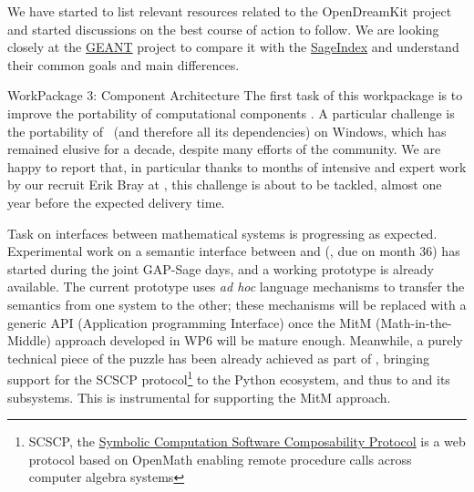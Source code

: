 \documentclass{deliverablereport}
\makeatletter
\renewcommand\subsubsection{\@startsection{subsubsection}{2}%
  \z@{.5\linespacing\@plus.7\linespacing}{.1\linespacing}%
  {\normalfont\bfseries}}
\makeatother
\begin{document}
We have started to list relevant resources related to the OpenDreamKit project and started discussions
on the best course of action to follow. We are looking closely at the \href{https://oer.geant.org/}{GEANT} 
project to compare it with the \href{http://sageindex.lipn.univ-paris13.fr/}{SageIndex} and understand their
common goals and main differences.

\clearpage
  \subsubsection{WorkPackage 3:  Component Architecture}
  The first task of this workpackage is to improve the portability of computational
  components . A particular challenge is
  the portability of \Sage\ (and therefore all its dependencies) on Windows, which has
  remained elusive for a decade, despite many efforts of the community. We are happy to
  report that, in particular thanks to months of intensive and expert work by our recruit
  Erik Bray at , this challenge is about to be tackled, almost one year before
  the expected delivery time.

  Task  on interfaces between
  mathematical systems is progressing as expected. Experimental work on a semantic
  interface between \GAP and \Sage
  (, due on month 36) has
  started during the joint GAP-Sage days, and a working prototype is already
  available. The current prototype uses \emph{ad hoc} language mechanisms to transfer the
  semantics from one system to the other; these mechanisms will be replaced with a generic
  API (Application programming Interface) once the MitM (Math-in-the-Middle) approach
  developed in WP6 will be mature enough. Meanwhile, a purely technical piece of the
  puzzle has been already achieved as part of
  , bringing support for the SCSCP
  protocol\footnote{SCSCP, the
    \href{http://www.symbolic-computing.org/science/index.php/SCSCP}{Symbolic Computation
      Software Composability Protocol} is a web protocol based on OpenMath enabling remote
    procedure calls across computer algebra systems} to the Python ecosystem, and thus to
  \Sage and its subsystems. This is instrumental for supporting the MitM approach.
\end{document}
